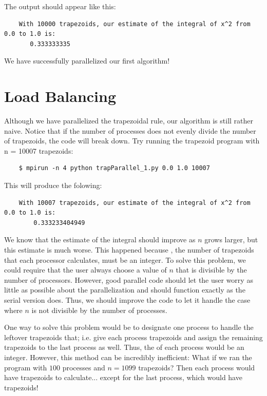   The output should appear like this:

  \begin{verbatim}
    With 10000 trapezoids, our estimate of the integral of x^2 from 0.0 to 1.0 is:
       0.333333335
  \end{verbatim}

  We have successfully parallelized our first algorithm!


\section*{Load Balancing}
  Although we have parallelized the trapezoidal rule, our algorithm is still rather naive. Notice that if the number of processes does not evenly divide the number of trapezoids, the code will break down. Try running the trapezoid program with n = 10007 trapezoids:

  \begin{verbatim}
    $ mpirun -n 4 python trapParallel_1.py 0.0 1.0 10007
  \end{verbatim}

  This will produce the folowing:

  \begin{verbatim}
    With 10007 trapezoids, our estimate of the integral of x^2 from 0.0 to 1.0 is:
        0.333233404949
  \end{verbatim}

  We know that the estimate of the integral should improve as $n$ grows larger, but this estimate is much worse. This happened because , the number of trapezoids that each processor calculates, must be an integer. To solve this problem, we could require that the user always choose a value of $n$ that is divisible by the number of processors. However, good parallel code should let the user worry as little as possible about the parallelization and should function exactly as the serial version does. Thus, we should improve the code to let it handle the case where $n$ is not divisible by the number of processes.

  One way to solve this problem would be to designate one process to handle the leftover trapezoids that; i.e. give each process  trapezoids and assign the remaining  trapezoids to the last process as well. Thus, the  of each process would be an integer. However, this method can be incredibly inefficient: What if we ran the program with $100$ processes and $n=1099$ trapezoids? Then each process would have  trapezoids to calculate... except for the last process, which would have  trapezoids!


